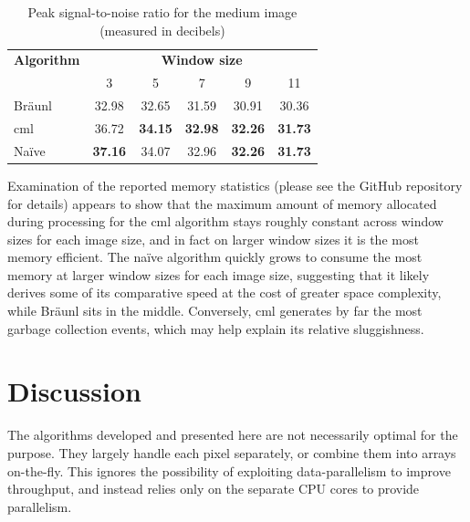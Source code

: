\begin{table}
\centering
\caption[Peak signal-to-noise for the medium image]{Peak signal-to-noise ratio for the medium image (measured in decibels)}
\begin{tabular}{@{}lccccc@{}}
\toprule
\multicolumn{1}{c}{\textbf{Algorithm}} & \multicolumn{5}{c}{\textbf{Window size}}                                           \\
                                       & 3              & 5              & 7              & 9              & 11             \\ \midrule
Bräunl                                 & 32.98          & 32.65          & 31.59          & 30.91          & 30.36          \\
\gls{cml}                                    & 36.72          & \textbf{34.15} & \textbf{32.98} & \textbf{32.26} & \textbf{31.73} \\
Naïve                                  & \textbf{37.16} & 34.07          & 32.96          & \textbf{32.26} & \textbf{31.73} \\ \bottomrule
\end{tabular}
\label{tab:median:psnrmedium}
\end{table}

Examination of the reported memory statistics (please see the GitHub repository for details) appears to show that the maximum amount of memory allocated during processing for the \gls{cml} algorithm stays roughly constant across window sizes for each image size, and in fact on larger window sizes it is the most memory efficient.  The naïve algorithm quickly grows to consume the most memory at larger window sizes for each image size, suggesting that it likely derives some of its comparative speed at the cost of greater space complexity, while Bräunl sits in the middle.  Conversely, \gls{cml} generates by far the most garbage collection events, which may help explain its relative sluggishness.

\section{Discussion}

The algorithms developed and presented here are not necessarily optimal for the purpose.  They largely handle each pixel separately, or combine them into arrays on-the-fly.  This ignores the possibility of exploiting data-parallelism to improve throughput, and instead relies only on the separate CPU cores to provide parallelism.

